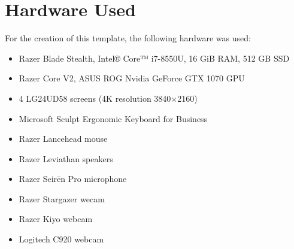\chapter{Hardware Used}
For the creation of this template, the following hardware was used:
\begin{itemize}
\item Razer Blade Stealth, Intel® Core™ i7-8550U, 16 GiB RAM, 512 GB SSD
\item Razer Core V2, ASUS ROG Nvidia GeForce GTX 1070 GPU
\item 4 LG24UD58 screens (4K resolution 3840×2160)
\item Microsoft Sculpt Ergonomic Keyboard for Business
\item Razer Lancehead mouse
\item Razer Leviathan speakers
\item Razer Seirēn Pro microphone
\item Razer Stargazer wecam
\item Razer Kiyo webcam
\item Logitech C920 webcam
\end{itemize}
